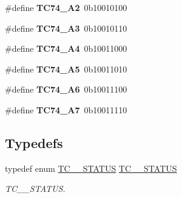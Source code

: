 \begin{DoxyCompactItemize}
\item 
\hypertarget{group__tc74__device__driver_gab62348c57fa13a8974137275e4b7f96a}{\#define {\bfseries T\-C74\-\_\-\-A2}~0b10010100}\label{group__tc74__device__driver_gab62348c57fa13a8974137275e4b7f96a}

\item 
\hypertarget{group__tc74__device__driver_ga0c653dfe7b677d79e462d1ca38efeee0}{\#define {\bfseries T\-C74\-\_\-\-A3}~0b10010110}\label{group__tc74__device__driver_ga0c653dfe7b677d79e462d1ca38efeee0}

\item 
\hypertarget{group__tc74__device__driver_ga01eabedb9b5c62b5e28dd836b995f40e}{\#define {\bfseries T\-C74\-\_\-\-A4}~0b10011000}\label{group__tc74__device__driver_ga01eabedb9b5c62b5e28dd836b995f40e}

\item 
\hypertarget{group__tc74__device__driver_gac4221f11526c8fafe1fd445fae29f95b}{\#define {\bfseries T\-C74\-\_\-\-A5}~0b10011010}\label{group__tc74__device__driver_gac4221f11526c8fafe1fd445fae29f95b}

\item 
\hypertarget{group__tc74__device__driver_gab72a0348d33babf7b729b45549cef20f}{\#define {\bfseries T\-C74\-\_\-\-A6}~0b10011100}\label{group__tc74__device__driver_gab72a0348d33babf7b729b45549cef20f}

\item 
\hypertarget{group__tc74__device__driver_ga0faaf7a88a9db3056d9bdb0baa2ff223}{\#define {\bfseries T\-C74\-\_\-\-A7}~0b10011110}\label{group__tc74__device__driver_ga0faaf7a88a9db3056d9bdb0baa2ff223}

\end{DoxyCompactItemize}
\subsection*{Typedefs}
\begin{DoxyCompactItemize}
\item 
typedef enum \hyperlink{group__tc74__device__driver_ga5efc26e94b9e9e19bd364c2d8b57f00f}{T\-C\-\_\-\_\-\-S\-T\-A\-T\-U\-S} \hyperlink{group__tc74__device__driver_ga974cb81ee48ba6da20d487bacf8b44c8}{T\-C\-\_\-\_\-\-S\-T\-A\-T\-U\-S}
\begin{DoxyCompactList}\small\item\em T\-C\-\_\-\_\-\-S\-T\-A\-T\-U\-S. \end{DoxyCompactList}\end{DoxyCompactItemize}
